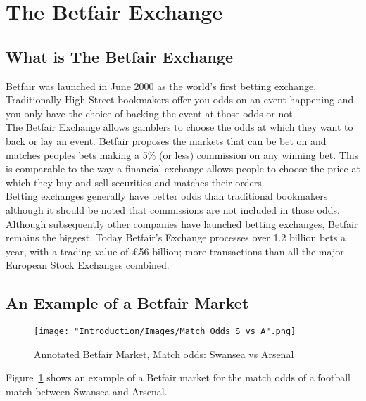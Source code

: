 \section{The Betfair Exchange}

	\subsection{What is The Betfair Exchange}
Betfair was launched in June 2000 as the world's first betting exchange\cite{WhatIsBetfair}.\\

Traditionally High Street bookmakers offer you odds on an event happening and you only have the choice of backing the event at those odds or not.\\

The Betfair Exchange allows gamblers to choose the odds at which they want to back or lay an event. Betfair proposes the markets that can be bet on and matches peoples bets making a 5\% (or less) commission on any winning bet. This is comparable to the way a financial exchange allows people to choose the price at which they buy and sell securities and matches their orders.\\

Betting exchanges generally have better odds than traditional bookmakers although it should be noted that commissions are not included in those odds.\\

Although subsequently other companies have launched betting exchanges, Betfair remains the biggest\cite{BettingExchangesCompared}. Today Betfair's Exchange processes over 1.2 billion bets a year, with a trading value of \pounds56 billion; more transactions than all the major European Stock Exchanges combined\cite{ABettingRevolution}.

	\subsection{An Example of a Betfair Market}
	
		\begin{figure}[H]
			\texttt{[image: "Introduction/Images/Match Odds S vs A".png]}
			\centering
			\caption{Annotated Betfair Market, Match odds: Swansea vs Arsenal}
    			\label{fig:annotatedMatchOdds}
		\end{figure}		
		
Figure~\ref{fig:annotatedMatchOdds} shows an example of a Betfair market for the match odds of a football match between Swansea and Arsenal.\\

